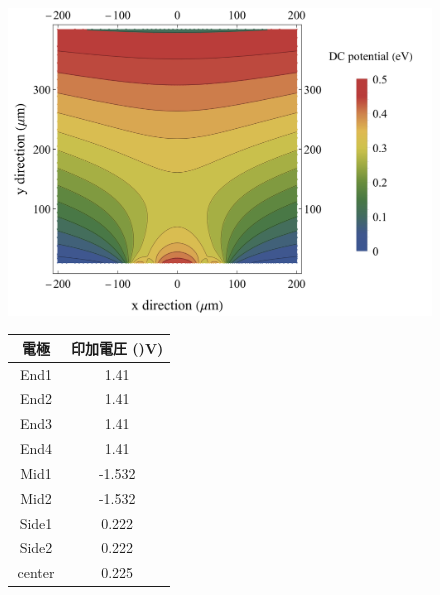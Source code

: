 \begin{figure}[h]
	\begin{center}
		\begin{minipage}{0.45\linewidth}
			\begin{center}
				\includegraphics[width = 1.2\columnwidth]{./simulation/figure/dc_potential_example.png}
			\end{center}
		\end{minipage}
		\begin{minipage}{0.45\linewidth}
			\begin{center}
				\begin{tabular}{c|c} \hline \hline
					電極　& 印加電圧 ()V) \\ \hline
					End1 & 1.41 \\ \hline
					End2 & 1.41 \\ \hline
					End3 & 1.41 \\ \hline
					End4 & 1.41 \\ \hline
					Mid1 & -1.532 \\ \hline
					Mid2 & -1.532 \\ \hline
					Side1 & 0.222 \\ \hline
					Side2 & 0.222 \\ \hline
					center & 0.225 \\ \hline
				\end{tabular}
			\end{center}
		\end{minipage}
	\end{center}
\end{figure}
